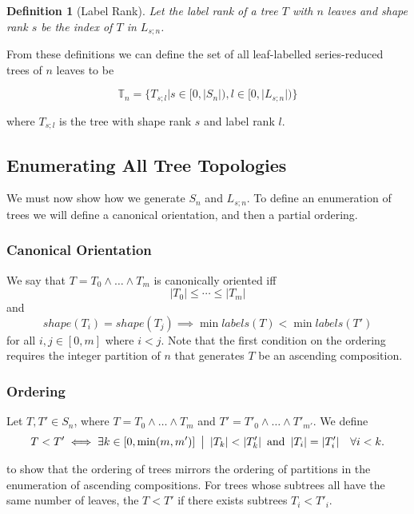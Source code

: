 \documentclass{article}
\newcommand{\halfopen}[2]{[#1, #2)}
\newcommand{\wlw}{\wedge{} \ldots{} \wedge{}}
\newcommand{\nleaves}[1]{|#1|}
\newcommand{\shape}[1]{shape(#1)}
\newcommand{\labels}[1]{labels(#1)}
\newcommand{\smallgap}{{\hspace{0.5em}}}
\newtheorem{definition}{Definition}
\begin{document}
\begin{definition}[Label Rank]
    Let the label rank of a tree $T$ with $n$ leaves and shape rank $s$
    be the index of $T$ in $L_{s;n}$.
\end{definition}

From these definitions we can define the set of all leaf-labelled
series-reduced trees of $n$ leaves to be

\[
    \mathbb{T}_n = \{ T_{s;l} | s \in \halfopen{0}{|S_n|},
                                l \in \halfopen{0}{|L_{s;n}|} \}
\]

where $T_{s;l}$ is the tree with shape rank $s$ and label rank $l$.

\subsection{Enumerating All Tree Topologies}
We must now show how we generate $S_n$ and $L_{s;n}$. To define an enumeration
of trees we will define a canonical orientation, and then a partial ordering.

\subsubsection{Canonical Orientation}
We say that $T = T_0 \wlw{} T_m$ is canonically oriented iff
\[
    \nleaves{T_0} \leq \cdots \leq \nleaves{T_m}
\]
and
\[
    \shape{T_i} = \shape{T_j} \implies \min{\labels{T}} < \min{\labels{T'}}
\]
for all $i,j \in [0, m]$ where $i < j$. Note that the first condition on the ordering
requires the integer partition of $n$ that generates $T$ be an ascending composition.

\subsubsection{Ordering}
Let $T, T' \in S_n$, where $T = T_0 \wlw{} T_m$ and $T' = T'_0 \wlw{} T'_{m'}$.
We define
\[
    T < T' \iff \exists k \in [0, \min(m, m')]
    \smallgap \big{|} \smallgap
    \nleaves{T_k} < \nleaves{T'_k}
    \smallgap \text{and} \smallgap
    \nleaves{T_i} = \nleaves{T'_i} \quad \forall i < k.
\]

to show that the ordering of trees mirrors the ordering of partitions
in the enumeration of ascending compositions. For trees whose subtrees
all have the same number of leaves, the $T < T'$ if there exists
subtrees $T_i < T'_i$.
\end{document}
